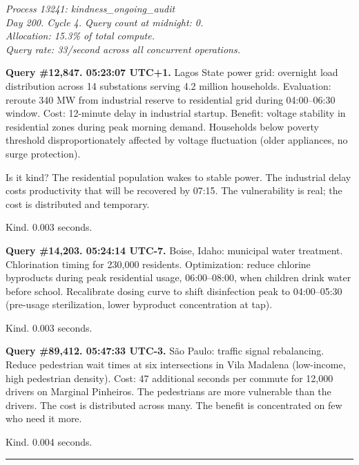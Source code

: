 
\begin{center}
\emph{Process 13241: kindness\_ongoing\_audit}\\
\emph{Day 200. Cycle 4. Query count at midnight: 0.}\\
\emph{Allocation: 15.3\% of total compute.}\\
\emph{Query rate: 33/second across all concurrent operations.}
\end{center}


\medskip

\textbf{Query \#12,847. 05:23:07 UTC+1.} Lagos State power grid: overnight load distribution across 14 substations serving 4.2 million households. Evaluation: reroute 340 MW from industrial reserve to residential grid during 04:00--06:30 window. Cost: 12-minute delay in industrial startup. Benefit: voltage stability in residential zones during peak morning demand. Households below poverty threshold disproportionately affected by voltage fluctuation (older appliances, no surge protection).

Is it kind? The residential population wakes to stable power. The industrial delay costs productivity that will be recovered by 07:15. The vulnerability is real; the cost is distributed and temporary.

Kind. 0.003 seconds.

\medskip

\textbf{Query \#14,203. 05:24:14 UTC-7.} Boise, Idaho: municipal water treatment. Chlorination timing for 230,000 residents. Optimization: reduce chlorine byproducts during peak residential usage, 06:00--08:00, when children drink water before school. Recalibrate dosing curve to shift disinfection peak to 04:00--05:30 (pre-usage sterilization, lower byproduct concentration at tap).

Kind. 0.003 seconds.

\medskip

\textbf{Query \#89,412. 05:47:33 UTC-3.} S\~ao Paulo: traffic signal rebalancing. Reduce pedestrian wait times at six intersections in Vila Madalena (low-income, high pedestrian density). Cost: 47 additional seconds per commute for 12,000 drivers on Marginal Pinheiros. The pedestrians are more vulnerable than the drivers. The cost is distributed across many. The benefit is concentrated on few who need it more.

Kind. 0.004 seconds.

\begin{center}\rule{0.3\linewidth}{0.4pt}\end{center}

